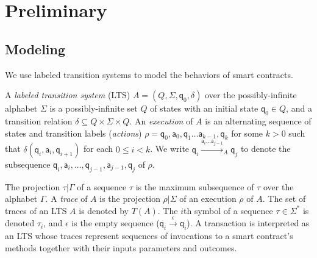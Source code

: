 
\chapter{Preliminary}
\label{sec:preli}


\section{Modeling}

We use labeled transition systems to model the behaviors of smart contracts. 


A \emph{labeled transition system} (LTS) $A=(Q,\Sigma,  \mathsf{q}_0, \delta)$ over the possibly-infinite alphabet
$\Sigma$ is a possibly-infinite set $Q$ of states with
an initial state $\mathsf{q}_0 \in Q$, and a transition relation $\delta \subseteq Q \times \Sigma \times
Q$. An \emph{execution} of $A$ is an alternating sequence of states and transition labels (\emph{actions}) $\rho = \mathsf{q}_0, \mathsf{a}_0,\mathsf{q}_1\ldots \mathsf{a}_{k-1},\mathsf{q}_k$ for some $k>0$ such that $\delta(\mathsf{q}_i, \mathsf{a}_i, \mathsf{q}_{i+1})$ for each $0\leq i<k$. We write $\mathsf{q}_i\xrightarrow{\mathsf{a}_i\ldots \mathsf{a}_{j-1}}_A \mathsf{q}_j$ to denote the subsequence $\mathsf{q}_i,\mathsf{a}_i,...,\mathsf{q}_{j-1},\mathsf{a}_{j-1},\mathsf{q}_j$ of $\rho$.


The projection $\tau| \Gamma$ of a sequence $\tau$ is the maximum subsequence of $\tau$ over the alphabet $\Gamma$. %
A \emph{trace} of $A$ is the projection $\rho | \Sigma$ of an execution $\rho$ of $A$.
The set of traces of an LTS $A$ is denoted by $\mathit{T}(A)$. %
The $i$th symbol of a sequence $\tau \in \Sigma^*$ is denoted $\tau_i$, and $\epsilon$ is the empty
sequence ($\mathsf{q}_i\xrightarrow{\epsilon}\mathsf{q}_i$). A transaction is interpreted as an LTS whose traces represent sequences of invocations to a smart contract's methods together with their inputs parameters and outcomes. 



